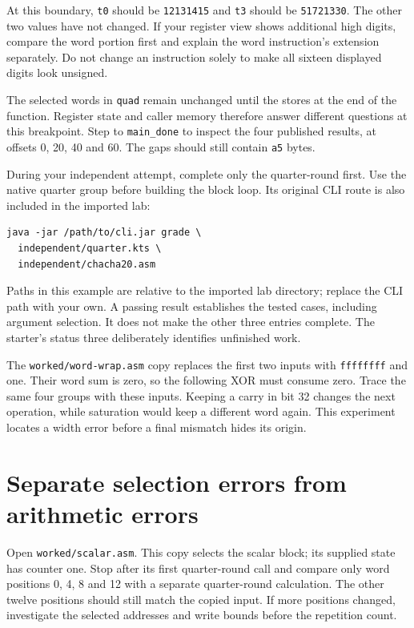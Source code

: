 At this boundary, \texttt{t0} should be \texttt{12131415} and \texttt{t3}
should be \texttt{51721330}. The other two values have not changed. If your
register view shows additional high digits, compare the word portion first and
explain the word instruction's extension separately. Do not change an
instruction solely to make all sixteen displayed digits look unsigned.

The selected words in \texttt{quad} remain unchanged until the stores at the
end of the function. Register state and caller memory therefore answer different
questions at this breakpoint. Step to \texttt{main\_done} to inspect the four
published results, at offsets 0, 20, 40 and 60. The gaps should still contain
\texttt{a5} bytes.

During your independent attempt, complete only the quarter-round first. Use
the native quarter group before building the block loop. Its original CLI route
is also included in the imported lab:

\begin{Verbatim}[fontsize=\small]
java -jar /path/to/cli.jar grade \
  independent/quarter.kts \
  independent/chacha20.asm
\end{Verbatim}

Paths in this example are relative to the imported lab directory; replace the
CLI path with your own. A passing result establishes the tested cases,
including argument selection. It does not make the other three entries complete.
The starter's status three deliberately identifies unfinished work.

The \texttt{worked/word-wrap.asm} copy replaces the first two inputs with
\texttt{ffffffff} and one. Their word sum is zero, so the following XOR must
consume zero. Trace the same four groups with these inputs. Keeping a carry in
bit 32 changes the next operation, while saturation would keep a different word
again. This experiment locates a width error before a final mismatch hides its
origin.

\section{Separate selection errors from arithmetic errors}

Open \texttt{worked/scalar.asm}. This copy selects the scalar block; its supplied state
has counter one. Stop after its first quarter-round call and compare only word
positions 0, 4, 8 and 12 with a separate quarter-round calculation. The other
twelve positions should still match the copied input. If more positions changed,
investigate the selected addresses and write bounds before the repetition count.

